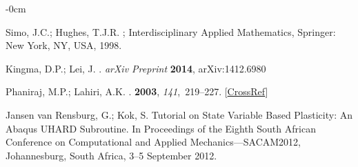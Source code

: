 \documentclass[algorithms,article,accept,pdftex,oneauthors]{Definitions/mdpi}
\begin{document}
\begin{adjustwidth}{-\extralength}{0cm}
\begin{thebibliography}{999}
Simo, J.C.; Hughes, T.J.R.
; Interdisciplinary Applied
Mathematics, {Springer}: {New York}, NY, USA,  1998.

Kingma, D.P.; Lei, J.
. \emph{arXiv Preprint} \textbf{2014}, arXiv:1412.6980


Phaniraj, M.P.; Lahiri, A.K.
.
 {\bf 2003}, {\em
141},~219--227. [\href{http://dx.doi.org/10.1016/S0924-0136(02)01123-8}{CrossRef}]

{Jansen van Rensburg}, G.; Kok, S.
\newblock Tutorial on State Variable Based Plasticity: {{An Abaqus UHARD}}
Subroutine.
\newblock In Proceedings of the Eighth {{South African Conference}} on
{{Computational}} and {{Applied Mechanics}}---{{SACAM2012}}, Johannesburg, South Africa, 3--5 September 2012.

\end{thebibliography}


%




\PublishersNote{}
\end{adjustwidth}
\end{document}
